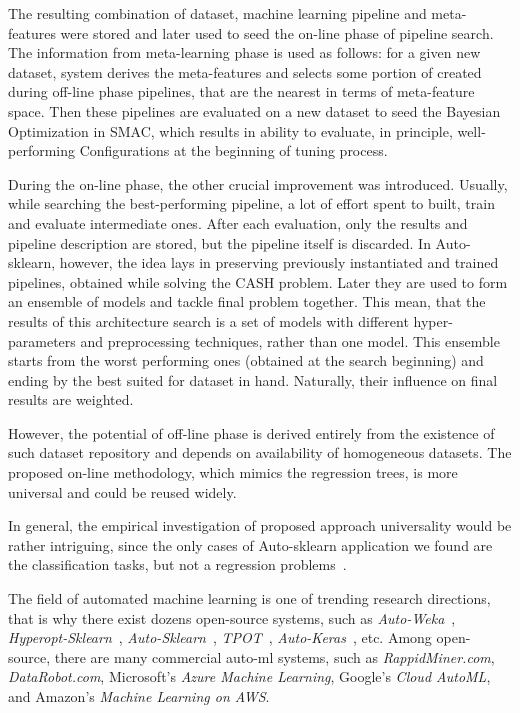 The resulting combination of dataset, machine learning pipeline and meta-features were stored and later used to seed the on-line phase of pipeline search.
The information from meta-learning phase is used as follows: for a given new dataset, system derives the meta-features and selects some portion of created during off-line phase pipelines, that are the nearest in terms of meta-feature space. Then these pipelines are evaluated on a new dataset to seed the Bayesian Optimization in SMAC, which results in ability to evaluate, in principle, well-performing Configurations at the beginning of tuning process.

During the on-line phase, the other crucial improvement was introduced. 
Usually, while searching the best-performing pipeline, a lot of effort spent to built, train and evaluate intermediate ones. After each evaluation, only the results and pipeline description are stored, but the pipeline itself is discarded. In Auto-sklearn, however, the idea lays in preserving previously instantiated and trained pipelines, obtained while solving the CASH problem. Later they are used to form an ensemble of models and tackle final problem together. This mean, that the results of this architecture search is a set of models with different hyper-parameters and preprocessing techniques, rather than one model. This ensemble starts from the worst performing ones (obtained at the search beginning) and ending by the best suited for dataset in hand. Naturally, their influence on final results are weighted.

However, the potential of off-line phase is derived entirely from the existence of such dataset repository and depends on availability of homogeneous datasets. The proposed on-line methodology, which mimics the regression trees, is more universal and could be reused widely.

In general, the empirical investigation of proposed approach universality would be rather intriguing, since the only cases of Auto-sklearn application we found are the classification tasks, but not a regression problems~\cite{feurer2015efficient,biedenkapp-ecai20}.


The field of automated machine learning is one of trending research directions, that is why there exist dozens open-source systems, such as \textit{Auto-Weka}~\cite{thornton2013auto}, \textit{Hyperopt-Sklearn}~\cite{komer2014hyperopt}, \textit{Auto-Sklearn}~\cite{feurer2015efficient}, \textit{TPOT}~\cite{olson2019tpot}, \textit{Auto-Keras}~\cite{jin2019auto}, etc. Among open-source, there are many commercial auto-ml systems, such as \textit{RappidMiner.com}, \textit{DataRobot.com}, Microsoft’s \textit{Azure Machine Learning}, Google’s \textit{Cloud AutoML}, and Amazon's \textit{Machine Learning on AWS}.


